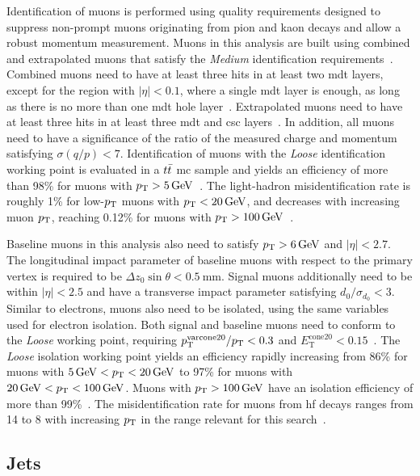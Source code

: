 Identification of muons is performed using quality requirements designed to suppress non-prompt muons originating from pion and kaon decays and allow a robust momentum measurement. Muons in this analysis are built using combined and extrapolated muons that satisfy the \textit{Medium} identification requirements~\cite{PERF-2015-10}. Combined muons need to have at least three hits in at least two \gls{mdt} layers, except for the region with $\vert\eta\vert < 0.1$, where a single \gls{mdt} layer is enough, as long as there is no more than one \gls{mdt} hole layer~\cite{Aad:2020gmm}. Extrapolated muons need to have at least three hits in at least three \gls{mdt} and \gls{csc} layers~\cite{Aad:2020gmm}. In addition, all muons need to have a significance of the ratio of the measured charge and momentum satisfying $\sigma(q/p) < 7$. Identification of muons with the \textit{Loose} identification working point is evaluated in a $t\bar{t}$ \gls{mc} sample and yields an efficiency of more than 98\% for muons with $\pt > \SI{5}{\GeV}$~\cite{Aad:2020gmm}. The light-hadron misidentification rate is roughly 1\% for low-$p_{\textrm{T}}$ muons with $\pt < \SI{20}{\GeV}$, and decreases with increasing muon $p_{\textrm{T}}$, reaching 0.12\% for muons with $\pt > \SI{100}{\GeV}$~\cite{Aad:2020gmm}.

Baseline muons in this analysis also need to satisfy $\pt > \SI{6}{\GeV}$ and $\vert\eta\vert < 2.7$. The longitudinal impact parameter of baseline muons with respect to the primary vertex is required to be $\Delta z_0\sin\theta < \SI{0.5}{\milli\meter}$. Signal muons additionally need to be within $\vert\eta\vert < 2.5$ and have a transverse impact parameter satisfying $d_0/\sigma_{d_0} < 3$. Similar to electrons, muons also need to be isolated, using the same variables used for electron isolation. Both signal and baseline muons need to conform to the \textit{Loose} working point, requiring $p_{\mathrm{T}}^{\mathrm{varcone20}}/p_{\textrm{T}} < 0.3$ and $E_{\mathrm{T}}^{\mathrm{cone20}} < 0.15$~\cite{Aad:2020gmm}. The \textit{Loose} isolation working point yields an efficiency rapidly increasing from 86\% for muons with $\SI{5}{\GeV} < \pt < \SI{20}{\GeV}$ to 97\% for muons with $\SI{20}{\GeV} < \pt < \SI{100}{\GeV}$. Muons with $\pt > \SI{100}{\GeV}$ have an isolation efficiency of more than 99\%~\cite{Aad:2020gmm}. The misidentification rate for muons from \gls{hf} decays ranges from 14 to 8 with increasing $p_{\textrm{T}}$ in the range relevant for this search~\cite{Aad:2020gmm}.

\subsection{Jets}\label{sec:jets}

